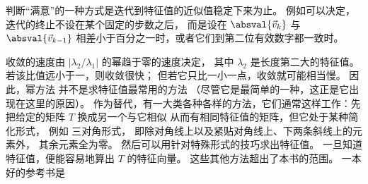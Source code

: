 判断“满意”的一种方式是迭代到特征值的近似值稳定下来为止。
例如可以决定，迭代的终止不设在某个固定的步数之后，
而是设在 $\absval{\vec{v}_k}$ 与 $\absval{\vec{v}_{k-1}}$
相差小于百分之一时，或者它们到第二位有效数字都一致时。

收敛的速度由 $|\lambda_2/\lambda_1|$ 的幂趋于零的速度决定，
其中 $\lambda_2$ 是长度第二大的特征值。
若该比值远小于一，则收敛很快；
但若它只比一小一点，收敛就可能相当慢。
因此，幂方法
并不是求特征值最常用的方法
（尽管它是最简单的一种，这正是它出现在这里的原因）。
作为替代，有一大类各种各样的方法，它们通常这样工作：先把给定的矩阵 $T$
换成另一个与它相似
从而有相同特征值的矩阵，但它处于某种简化形式，
例如
三对角形式，
即除对角线上以及紧贴对角线上、下两条斜线上的元素外，
其余元素全为零。
然后可以用针对特殊形式的技巧求出特征值。
一旦知道特征值，便能容易地算出
$T$ 的特征向量。
这些其他方法超出了本书的范围。
一本好的参考书是 \cite{Goult}



